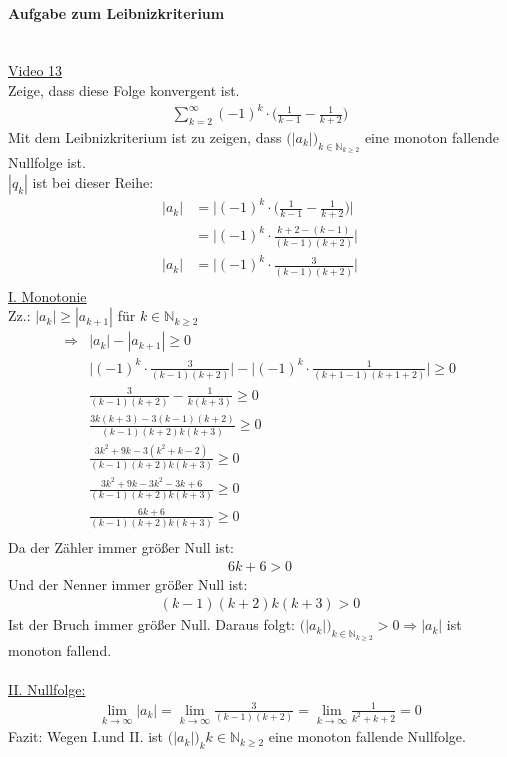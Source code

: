 \paragraph{Aufgabe zum Leibnizkriterium}$  $\vspace*{3mm}\\
\href{https://youtu.be/95O_7qUchvg}{Video 13}\\
Zeige, dass diese Folge konvergent ist.\\
\begin{align*}
\sum\limits_{k=2}^{\infty}(-1)^k\cdot \bigg(\frac{1}{k-1}-\frac{1}{k+2}\bigg)
\end{align*}
Mit dem Leibnizkriterium ist zu zeigen, dass $ \big(|a_k|\big)_{k\in \mathbb{N}_{k\geq 2}} $ eine monoton fallende Nullfolge ist.\\
$ |q_k| $ ist bei dieser Reihe:\\
\begin{align*}
|a_k|&=\bigg|(-1)^k\cdot \bigg(\frac{1}{k-1}-\frac{1}{k+2}\bigg) \bigg|\\
&=\bigg|(-1)^k\cdot\frac{k+2-(k-1)}{(k-1)(k+2)}\bigg|\\
|a_k|&=\bigg|(-1)^k\cdot\frac{3}{(k-1)(k+2)}\bigg|\\
\end{align*}
\underline{I. Monotonie}\\
Zz.: $ |a_k|\geq |a_{k+1}| $ für $ k\in \mathbb{N}_{k\geq 2} $\\
\begin{align*}
\Rightarrow &|a_k|-|a_{k+1}|\geq 0\\
&\bigg|(-1)^k\cdot\frac{3}{(k-1)(k+2)}\bigg|-\bigg|(-1)^k\cdot\frac{1}{(k+1-1)(k+1+2)}\bigg|\geq 0\\
&\frac{3}{(k-1)(k+2)}-\frac{1}{k(k+3)}\geq 0\\
&\frac{3k(k+3)-3(k-1)(k+2)}{(k-1)(k+2)k(k+3)}\geq 0\\
&\frac{3k^2+9k-3(k^2+k-2)}{(k-1)(k+2)k(k+3)}\geq 0\\
&\frac{3k^2+9k-3k^2-3k+6}{(k-1)(k+2)k(k+3)}\geq 0\\
&\frac{6k+6}{(k-1)(k+2)k(k+3)}\geq 0\\
\end{align*}
Da der Zähler immer größer Null ist:\\
\begin{align*}
6k+6>0
\end{align*}
Und der Nenner immer größer Null ist:\\
\begin{align*}
(k-1)(k+2)k(k+3)>0
\end{align*}
Ist der Bruch immer größer Null.
Daraus folgt: $ \big(|a_k| \big)_{k\in \mathbb{N}_{k\geq 2}}>0\Rightarrow |a_k|$ ist monoton fallend.\\
\\
\underline{II. Nullfolge:}\\
\begin{align*}
\lim\limits_ {k\to\infty}|a_k|=\lim\limits_ {k\to\infty}\frac{3}{(k-1)(k+2)}=\lim\limits_ {k\to\infty}\frac{1}{k^2+k+2}=0
\end{align*}
Fazit: Wegen I.und II. ist $ \big(|a_k|\big)_k{k\in\mathbb{N}_{k\geq2}} $ eine monoton fallende Nullfolge.\\

